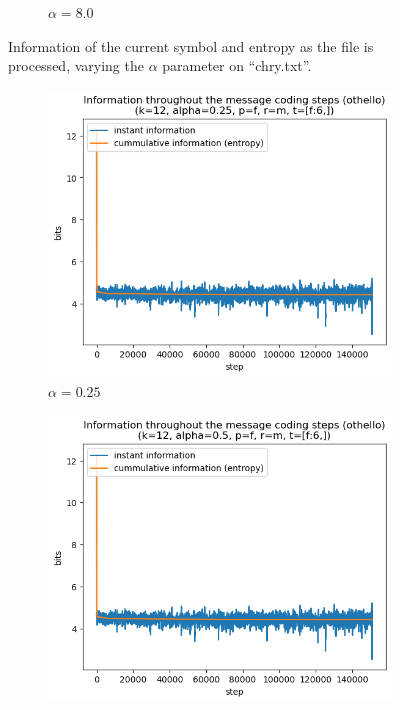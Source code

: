 \documentclass{article}
\begin{document}
\begin{figure}
\begin{subfigure}[b]{0.3\textwidth}
\begin{center}
        \end{center}
        \caption{$\alpha = 8.0$}
        \label{fig:results-alpha-8.0}
    \end{subfigure}
    \caption{Information of the current symbol and entropy as the file is processed, varying the $\alpha$ parameter on ``chry.txt''.}
    \label{fig:results-alpha}
\end{figure}

\begin{figure}
    \begin{subfigure}[b]{0.3\textwidth}
        \begin{center}
            \includegraphics[width=1.0\linewidth]{../scripts/images/othello_12_0.25_f_m_[f:6,].png}
        \end{center}
        \caption{$\alpha = 0.25$}
        \label{fig:results-alpha-other-0.25}
    \end{subfigure}
    \hfill
    \begin{subfigure}[b]{0.3\textwidth}
        \begin{center}
            \includegraphics[width=1.0\linewidth]{../scripts/images/othello_12_0.5_f_m_[f:6,].png}

\end{center}
\end{subfigure}
\end{figure}
\end{document}
